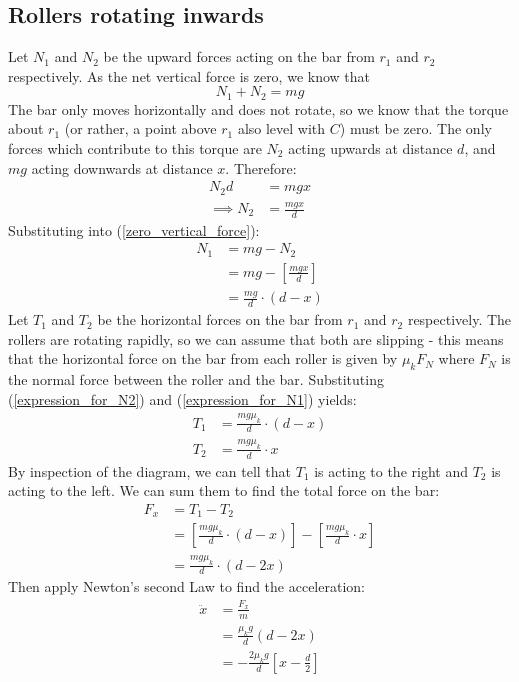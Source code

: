 \documentclass{article}
\begin{document}
\subsection{Rollers rotating inwards}
Let $N_1$ and $N_2$ be the upward forces acting on the bar from $r_1$ and $r_2$ respectively. As the net vertical force is zero, we know that
\begin{equation}
    \label{zero_vertical_force}
    N_1 + N_2 = mg
\end{equation}
The bar only moves horizontally and does not rotate, so we know that the torque about $r_1$ (or rather, a point above $r_1$ also level with $C$) must be zero. The only forces which contribute to this torque are $N_2$ acting upwards at distance $d$, and $mg$ acting downwards at distance $x$. Therefore:
\begin{align}
    N_2d &= mgx\\
    \implies N_2 &= \frac{mgx}{d}
    \label{expression_for_N2}
\end{align}
Substituting into (\ref{zero_vertical_force}):
\begin{align}
    N_1 &= mg - N_2\\
    &= mg - \left[ \frac{mgx}{d} \right]\\
    &= \frac{mg}{d} \cdot (d-x)
    \label{expression_for_N1}
\end{align}
Let $T_1$ and $T_2$ be the horizontal forces on the bar from $r_1$ and $r_2$ respectively. The rollers are rotating rapidly, so we can assume that both are slipping - this means that the horizontal force on the bar from each roller is given by $\mu_kF_N$ where $F_N$ is the normal force between the roller and the bar. Substituting (\ref{expression_for_N2}) and (\ref{expression_for_N1}) yields:
\begin{align}
    T_1 &= \frac{mg\mu_k}{d} \cdot (d-x)\\
    T_2 &= \frac{mg\mu_k}{d} \cdot x
\end{align}
By inspection of the diagram, we can tell that $T_1$ is acting to the right and $T_2$ is acting to the left. We can sum them to find the total force on the bar:
\begin{align}
    F_x &= T_1 - T_2\\
    &= \left[ \frac{mg\mu_k}{d} \cdot (d-x) \right] - \left[ \frac{mg\mu_k}{d} \cdot x \right]\\
    &= \frac{mg\mu_k}{d} \cdot (d-2x)
\end{align}
Then apply Newton's second Law to find the acceleration:
\begin{align}
    \ddot{x} &= \frac{F_x}{m}\\
    &= \frac{\mu_kg}{d} (d-2x)\\
    &= -\frac{2\mu_kg}{d} \left[ x-\frac{d}{2} \right]
\end{align}
\end{document}

